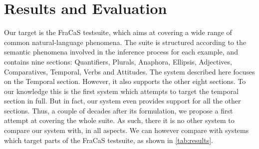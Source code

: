 \documentclass[11pt,a4paper]{article}
\begin{document}
\section{Results and Evaluation}
\label{sec:results}
Our target is the FraCaS testsuite, which aims at covering a wide
range of common natural-language phenomena. 
%
The suite is structured according to the semantic phenomena involved
in the inference process for each example, and contains nine sections:
Quantifiers, Plurals, Anaphora, Ellipsis, Adjectives, Comparatives,
Temporal, Verbs and Attitudes.  The system described here focuses on
the Temporal section. However, it also supports the other eight
sections.  To our knowledge this is the first system which attempts to
target the temporal section in full. But in fact, our system even provides
support for all the other sections. Thus, a couple of decades after its
formulation, we propose a first attempt at covering the whole suite.
As such, there it is no other system to compare our system with, in
all aspects.  We can however compare with systems which target parts
of the FraCaS testsuite, as shown in \cref{tab:results}.
\end{document}
